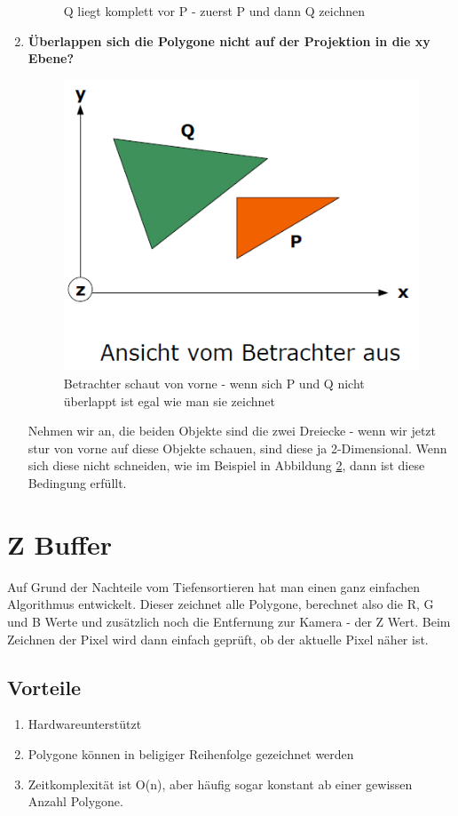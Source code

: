 \begin{enumerate}
\begin{figure}[!ht]
		\caption{Q liegt komplett vor P - zuerst P und dann Q zeichnen}
		\label{fig:tiefensortierung_4}
	\end{figure}
	\item \textbf{Überlappen sich die Polygone nicht auf der Projektion in die xy Ebene?}\\
	\begin{figure}[!ht]
		\centering
		\includegraphics[width=0.5\linewidth]{fig/tiefensortierung_5}
		\caption{Betrachter schaut von vorne - wenn sich P und Q nicht überlappt ist egal wie man sie zeichnet}
		\label{fig:tiefensortierung_5}
	\end{figure}
	Nehmen wir an, die beiden Objekte sind die zwei Dreiecke - wenn wir jetzt stur von vorne auf diese Objekte schauen, sind diese ja 2-Dimensional. Wenn sich diese nicht schneiden, wie im Beispiel in Abbildung \ref{fig:tiefensortierung_5}, dann ist diese Bedingung erfüllt.
	
\end{enumerate}
\section{Z Buffer}
Auf Grund der Nachteile vom Tiefensortieren hat man einen ganz einfachen Algorithmus entwickelt. Dieser zeichnet alle Polygone, berechnet also die R, G und B Werte und zusätzlich noch die Entfernung zur Kamera - der Z Wert. Beim Zeichnen der Pixel wird dann einfach geprüft, ob der aktuelle Pixel näher ist.
\subsection{Vorteile}
\begin{enumerate}
	\item Hardwareunterstützt
	\item Polygone können in beligiger Reihenfolge gezeichnet werden
	\item Zeitkomplexität ist O(n), aber häufig sogar konstant ab einer gewissen Anzahl Polygone.
\end{enumerate}
